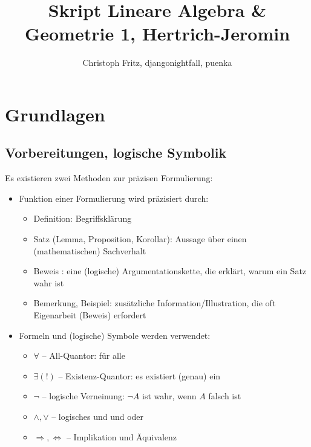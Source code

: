 \documentclass[12pt,a4paper,parskip=half-,DIV=15]{scrartcl}
\author{Christoph Fritz, djangonightfall, puenka}
\title{Skript Lineare Algebra \& Geometrie 1, Hertrich-Jeromin}
\begin{document}
\maketitle
\tableofcontents
\section{Grundlagen}
\subsection{Vorbereitungen, logische Symbolik}
Es existieren zwei Methoden zur präzisen Formulierung:
\begin{itemize}
\item Funktion einer Formulierung wird präzisiert durch: 
	\begin{itemize}
	\item Definition: Begriffsklärung
	\item Satz (Lemma, Proposition, Korollar): Aussage über einen (mathematischen) Sachverhalt
	\item Beweis : eine (logische) Argumentationskette, die erklärt, warum ein Satz wahr ist
	\item Bemerkung, Beispiel: zusätzliche Information/Illustration, die oft Eigenarbeit (Beweis) erfordert
	\end{itemize}
\item Formeln und (logische) Symbole werden verwendet:
	\begin{itemize}
	\item $\forall$ -- All-Quantor: \glqq für alle\grqq
	\item $\exists(!)$ -- Existenz-Quantor: \glqq es existiert (genau) ein\grqq
	\item $\lnot$ -- logische Verneinung: $\lnot A$ ist wahr, wenn $A$ falsch ist
	\item $\land ,\lor$ -- logisches \glqq und\grqq{} und \glqq oder\grqq
	\item $\Rightarrow ,\Leftrightarrow$ -- Implikation und Äquivalenz
	\end{itemize}
\end{itemize}
\end{document}
